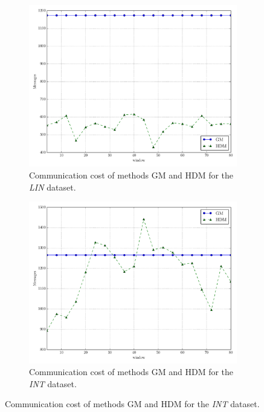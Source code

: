 \begin{figure}[!h]
\begin{subfigure}{0.32\textwidth}
  \includegraphics[width=\linewidth]{img/main_msg_linear_window.pdf}
  \caption{Communication cost of methods GM and HDM for the \emph{LIN} dataset.}
\end{subfigure}\hfill
\begin{subfigure}{0.32\textwidth}
  \includegraphics[width=\linewidth]{img/main_msg_interweaving_window.pdf}
  \caption{Communication cost of methods GM and HDM for the \emph{INT} dataset.}
\end{subfigure}\hfill

\end{figure}

